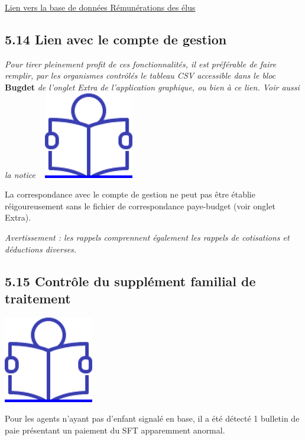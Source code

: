 \href{../Bases/Reglementation/remunerations.elu.csv}{Lien vers la base de
données Rémunérations des élus}

\hypertarget{lien-avec-le-compte-de-gestion}{%
\subsection{5.14 Lien avec le compte de
gestion}\label{lien-avec-le-compte-de-gestion}}

\emph{Pour tirer pleinement profit de ces fonctionnalités, il est
préférable de faire remplir, par les organismes contrôlés le tableau CSV
accessible dans le bloc} \textbf{Bugdet} \emph{de l'onglet Extra de
l'application graphique, ou bien à ce lien. Voir aussi la notice} ~
\href{../Docs/Notices/fiche_tableau_budget.odt}{\includegraphics{icones/Notice.png}}

La correspondance avec le compte de gestion ne peut pas être établie
réigoureusement sans le fichier de correspondance paye-budget (voir
onglet Extra).

\emph{Avertissement : les rappels comprennent également les rappels de
cotisations et déductions diverses.}

\hypertarget{controle-du-supplement-familial-de-traitement}{%
\subsection{5.15 Contrôle du supplément familial de
traitement}\label{controle-du-supplement-familial-de-traitement}}

\href{../Docs/Notices/fiche_SFT.odt}{\includegraphics{icones/Notice.png}}

Pour les agents n'ayant pas d'enfant signalé en base, il a été détecté 1
bulletin de paie présentant un paiement du SFT apparemment anormal.

